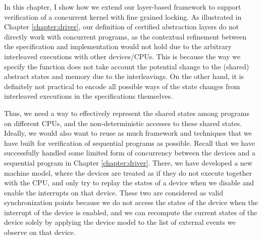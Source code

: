 
In this chapter, I show how we extend our layer-based framework to support
verification of a concurrent kernel with fine grained locking.
As illustrated in Chapter \ref{chapter:driver}, our definition of
certified abstraction layers do not directly work with concurrent programs,
as the contextual refinement between the specification and implementation
would not hold due to the arbitrary interleaved executions with other
devices/CPUs. This is because the way we specify the function
does not take account the potential change to the (shared) abstract states
and memory due to the interleavings. On the other hand, it is definitely
not practical to encode all possible ways of the state changes from
interleaved executions in the specifications themselves.

Thus, we need a way to effectively represent the shared states among programs
on different CPUs, and the non-deterministic accesses to these shared
states. Ideally, we would also want to reuse as much framework and techniques
that we have built for verification of sequential programs as possible.
Recall that we have successfully handled some limited form of concurrency
between the devices and a sequential program in Chapter \ref{chapter:driver}.
There, we have developed a new machine model, where the devices are treated
as if they do not execute together with the CPU, and only try to replay
the states of a device when we disable and enable the interrupts on that
device. These two are considered as valid synchronization points because
we do not access the states of the device when the interrupt of the device
is enabled, and we can recompute the current states of the device solely by
applying the device model to the list of external events we observe on that device.

